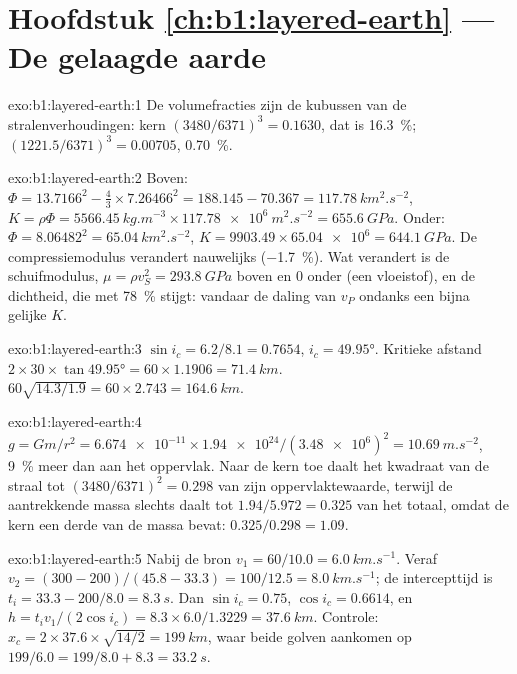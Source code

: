 \section*{Hoofdstuk \ref{ch:b1:layered-earth} --- De gelaagde aarde}

\begin{solution}{exo:b1:layered-earth:1}
De volumefracties zijn de kubussen van de stralenverhoudingen: kern
$(3480/6371)^3 = 0.1630$, dat is \qty{16.3}{\percent}; 
$(1221.5/6371)^3 = 0.00705$, \qty{0.70}{\percent}.
\end{solution}

\begin{solution}{exo:b1:layered-earth:2}
Boven: $\Phi = 13.7166^2 - \tfrac43\times7.26466^2 = 188.145 - 70.367 =
\qty{117.78}{km^2.s^{-2}}$, $K = \rho\Phi = \qty{5566.45}{kg.m^{-3}}\times
\qty{117.78e6}{m^2.s^{-2}} = \qty{655.6}{GPa}$. Onder: $\Phi = 8.06482^2 =
\qty{65.04}{km^2.s^{-2}}$, $K = 9903.49\times\num{65.04e6} = \qty{644.1}{GPa}$.
De compressiemodulus verandert nauwelijks (\qty{-1.7}{\percent}). Wat verandert is de
schuifmodulus, $\mu = \rho v_S^2 = \qty{293.8}{GPa}$ boven en $0$ onder (een vloeistof), en de
dichtheid, die met \qty{78}{\percent} stijgt: vandaar de daling van $v_P$ ondanks een bijna gelijke $K$.
\end{solution}

\begin{solution}{exo:b1:layered-earth:3}
$\sin i_c = 6.2/8.1 = 0.7654$, $i_c = \ang{49.95}$. Kritieke afstand
$2\times30\times\tan\ang{49.95} = 60\times1.1906 = \qty{71.4}{km}$. 
$60\sqrt{14.3/1.9} = 60\times2.743 = \qty{164.6}{km}$.
\end{solution}

\begin{solution}{exo:b1:layered-earth:4}
$g = Gm/r^2 = \num{6.674e-11}\times\num{1.94e24}/(\num{3.48e6})^2 =
\qty{10.69}{m.s^{-2}}$, \qty{9}{\percent} meer dan aan het oppervlak. Naar de kern toe daalt het kwadraat van de straal
tot $(3480/6371)^2 = 0.298$ van zijn oppervlaktewaarde, terwijl de aantrekkende massa slechts daalt tot
$1.94/5.972 = 0.325$ van het totaal, omdat de kern een derde van de massa bevat: $0.325/0.298 = 1.09$.
\end{solution}

\begin{solution}{exo:b1:layered-earth:5}
Nabij de bron $v_1 = 60/10.0 = \qty{6.0}{km.s^{-1}}$. Veraf
$v_2 = (300 - 200)/(45.8 - 33.3) = 100/12.5 = \qty{8.0}{km.s^{-1}}$; de
intercepttijd is $t_i = 33.3 - 200/8.0 = \qty{8.3}{s}$. Dan $\sin i_c =
0.75$, $\cos i_c = 0.6614$, en $h = t_i v_1/(2\cos i_c) = 8.3\times6.0/1.3229
= \qty{37.6}{km}$. Controle: $x_c = 2\times37.6\times\sqrt{14/2} = \qty{199}{km}$,
waar beide golven aankomen op $199/6.0 = 199/8.0 + 8.3 = \qty{33.2}{s}$.
\end{solution}

